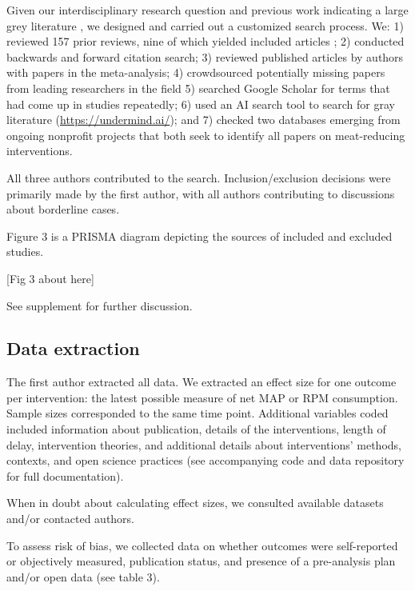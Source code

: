 \documentclass[sn-nature,referee,pdflatex]{sn-jnl}
\begin{document}
Given our interdisciplinary research question and previous work
indicating a large grey literature \citep{mathur2021meta}, we designed
and carried out a customized search process. We: 1) reviewed 157 prior
reviews, nine of which yielded included articles
\citep{mathur2021meta, bianchi2018conscious, bianchi2018restructuring, ammann2023, chang2023, DiGennaro2024, harguess2020, ronto2022, wynes2018};
2) conducted backwards and forward citation search; 3) reviewed
published articles by authors with papers in the meta-analysis; 4)
crowdsourced potentially missing papers from leading researchers in the
field 5) searched Google Scholar for terms that had come up in studies
repeatedly; 6) used an AI search tool to search for gray literature
(\url{https://undermind.ai/}); and 7) checked two databases emerging
from ongoing nonprofit projects that both seek to identify all papers on
meat-reducing interventions.

All three authors contributed to the search. Inclusion/exclusion
decisions were primarily made by the first author, with all authors
contributing to discussions about borderline cases.

Figure 3 is a PRISMA diagram depicting the sources of included and
excluded studies.

\begin{center}
[Fig 3 about here]
\end{center}

See supplement for further discussion.

\subsection{Data extraction}\label{sec3.3}

The first author extracted all data. We extracted an effect size for one
outcome per intervention: the latest possible measure of net MAP or RPM
consumption. Sample sizes corresponded to the same time point.
Additional variables coded included information about publication,
details of the interventions, length of delay, intervention theories,
and additional details about interventions' methods, contexts, and open
science practices (see accompanying code and data repository for full
documentation).

When in doubt about calculating effect sizes, we consulted available
datasets and/or contacted authors.

To assess risk of bias, we collected data on whether outcomes were
self-reported or objectively measured, publication status, and presence
of a pre-analysis plan and/or open data (see table 3).
\end{document}
